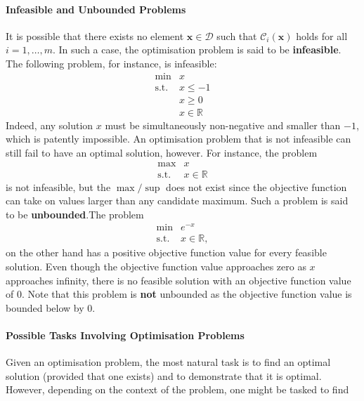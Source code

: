 \paragraph{Infeasible and Unbounded Problems}
It is possible that there exists no element
\(\mathbf{x} \in \mathcal{D}\) such that \(\mathcal{C}_i(\mathbf{x})\)
holds for all \(i = 1,\ldots,m\). In such a case, the optimisation
problem is said to be \textbf{infeasible}. \newl The following problem, for instance, is
infeasible: \[\begin{array}{rl}
\min & x \\
\mbox{s.t.}
 & x \leq -1 \\
 & x \geq 0 \\
 & x \in \mathbb{R}
\end{array}\]
Indeed, any solution $x$ must be simultaneously non-negative and smaller than $-1$, which is patently impossible. \newpage\noindent An optimisation problem that is not infeasible can still fail to have an optimal
solution, however. For instance, the problem \[\begin{array}{rl}
\max & x \\
\mbox{s.t.} &
x \in \mathbb{R}
\end{array}\] is not infeasible, but the $\max/\sup$ does not exist since the  objective function can take on values larger than any candidate maximum. Such a problem is said to be  \textbf{unbounded}.\newl The problem \[\begin{array}{rl}
\min & e^{-x} \\
\mbox{s.t.} & 
x \in \mathbb{R},
\end{array}\] on the other hand has a positive objective function value for every feasible
solution. Even though the objective function value approaches zero as
\(x\) approaches infinity, there is no feasible solution with an objective
function value of 0. Note that this problem is \textbf{not} unbounded as
the objective function value is bounded below by 0.
\paragraph{Possible Tasks Involving Optimisation Problems}
Given an optimisation problem, the most natural task is to find an
optimal solution (provided that one exists) and to demonstrate that it is
optimal. However, depending on the context of the problem, one might be
tasked to find

